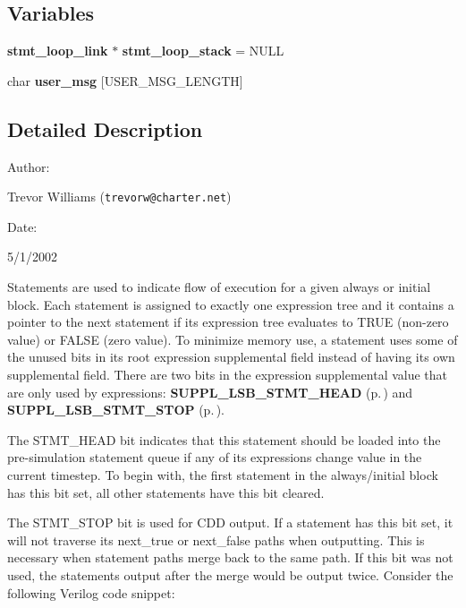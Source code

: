 \subsection*{Variables}
\begin{CompactItemize}
\item 
{\bf stmt\_\-loop\_\-link} $\ast$ {\bf stmt\_\-loop\_\-stack} = NULL
\item 
char {\bf user\_\-msg} [USER\_\-MSG\_\-LENGTH]
\end{CompactItemize}


\subsection{Detailed Description}


\begin{Desc}
\item[Author: ]\par
Trevor Williams ({\tt trevorw@charter.net}) \end{Desc}
\begin{Desc}
\item[Date: ]\par
5/1/2002

 Statements are used to indicate flow of execution for a given always or initial block. Each statement is assigned to exactly one expression tree and it contains a pointer to the next statement if its expression tree evaluates to TRUE (non-zero value) or FALSE (zero value). To minimize memory use, a statement  uses some of the unused bits in its root expression supplemental field instead of having its own supplemental field. There are two bits in the expression supplemental value that are only used by expressions: {\bf SUPPL\_\-LSB\_\-STMT\_\-HEAD} {\rm (p.\,\pageref{group__expr__suppl_a4})} and {\bf SUPPL\_\-LSB\_\-STMT\_\-STOP} {\rm (p.\,\pageref{group__expr__suppl_a5})}.

 The STMT\_\-HEAD bit indicates that this statement should be loaded into the pre-simulation statement queue if any of its expressions change value in the current timestep. To begin with, the first statement in the always/initial block has this bit set, all other statements have this bit cleared.

 The STMT\_\-STOP bit is used for CDD output. If a statement has this bit set, it will not traverse its next\_\-true or next\_\-false paths when outputting. This is necessary when statement paths merge back to the same path. If this bit was not used, the statements output after the merge would be output twice. Consider the following Verilog code snippet:\end{Desc}


